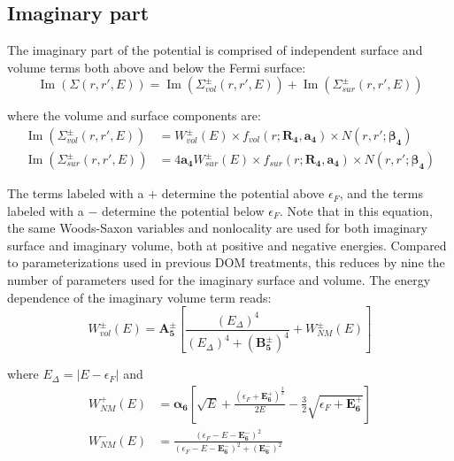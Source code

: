 \subsection{Imaginary part}
The imaginary part of the potential is comprised of independent surface and volume terms
both above and below the Fermi surface:
\begin{equation}
    \operatorname{Im}({\Sigma(r,r',E)}) =
    \operatorname{Im}({\Sigma_{vol}^{\pm}(r,r',E)})
    + \operatorname{Im}({\Sigma_{sur}^{\pm}(r,r',E)})
\end{equation}

\noindent
where the volume and surface components are:
\begin{equation}
    \begin{split}
        \operatorname{Im}({\Sigma_{vol}^{\pm}(r,r',E)})
        & = W_{vol}^{\pm}(E){\times}f_{vol}(r; \bm{R_{4}}, \bm{a_{4}})
        {\times}N(r,r'; \bm{\beta_{4}})\\
        \operatorname{Im}({\Sigma_{sur}^{\pm}(r,r',E)})
        & = 4\bm{a_{4}}W_{sur}^{\pm}(E){\times}f_{sur}(r; \bm{R_{4}}, \bm{a_{4}})
        {\times} N(r,r';\bm{\beta_{4}})
    \end{split}
\end{equation}

\noindent
The terms labeled with a $+$ determine the potential above $\epsilon_{F}$, and the terms labeled
with a $-$ determine the potential below $\epsilon_{F}$. Note that in this equation, the same
Woods-Saxon variables and nonlocality are used for both imaginary surface and imaginary volume,
both at positive and
negative energies. Compared to parameterizations used in previous DOM treatments,
this reduces by nine the number of parameters 
used for the imaginary surface and volume.
The energy dependence of the imaginary volume term reads:
\begin{equation} \label{ImagVolume}
    W_{vol}^{\pm}(E) = \bm{A_{5}^{\pm}}\left[\frac{(E_{\Delta})^{4}}
    {(E_{\Delta})^{4}+(\bm{B_{5}^{\pm}})^{4}} + W_{NM}^{\pm}(E)\right]
\end{equation}

\noindent
where $E_{\Delta} = |E-\epsilon_{F}|$ and
\begin{equation}
    \begin{split}
        W_{NM}^{+}(E) & = {\bm{\alpha_{6}}}\left[\sqrt{E} +
            \frac{(\epsilon_{F}+\bm{E^{+}_{6}})^{\frac{3}{2}}}{2E}
        -\frac{3}{2}\sqrt{\epsilon_{F}+\bm{E^{+}_{6}}}\right]\\
        W_{NM}^{-}(E) & = \frac{(\epsilon_{F}-E-\bm{E_{6}^{-}})^{2}}
        {(\epsilon_{F}-E-\bm{E_{6}^{-}})^{2}+(\bm{E_{6}^{-}})^{2}}
        \end{split}
    \end{equation}

